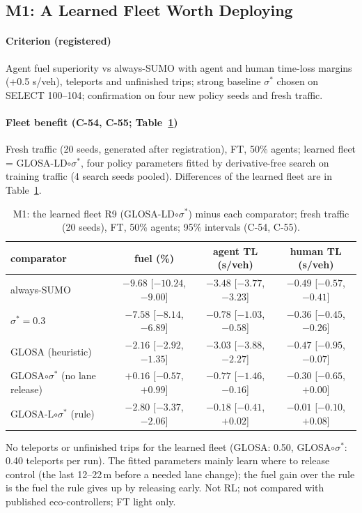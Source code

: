\subsection{M1: A Learned Fleet Worth Deploying}\label{sec:m1}
\paragraph{Criterion (registered)} Agent fuel superiority vs always-SUMO with agent and human time-loss margins (+0.5 s/veh),
teleports and unfinished trips; strong baseline $\sigma^*$ chosen on SELECT 100--104; confirmation on four new policy seeds and fresh traffic.
\paragraph{Fleet benefit (C-54, C-55; Table~\ref{tab:m1})} Fresh traffic (20 seeds, generated after registration), FT, 50\% agents; learned
fleet = GLOSA-LD$\circ\sigma^*$, four policy parameters fitted by derivative-free search on training traffic (4 search seeds pooled).
Differences of the learned fleet are in Table~\ref{tab:m1}.
\begin{table}[t]\centering\small
\caption{M1: the learned fleet R9 (GLOSA-LD$\circ\sigma^*$) minus each comparator; fresh traffic (20 seeds), FT, 50\% agents; 95\%
intervals (C-54, C-55).}\label{tab:m1}
\begin{tabular}{lccc}\toprule
comparator & fuel (\%) & agent TL (s/veh) & human TL (s/veh)\\\midrule
always-SUMO & $-9.68$ [$-10.24$, $-9.00$] & $-3.48$ [$-3.77$, $-3.23$] & $-0.49$ [$-0.57$, $-0.41$]\\
$\sigma^*=0.3$ & $-7.58$ [$-8.14$, $-6.89$] & $-0.78$ [$-1.03$, $-0.58$] & $-0.36$ [$-0.45$, $-0.26$]\\
GLOSA (heuristic) & $-2.16$ [$-2.92$, $-1.35$] & $-3.03$ [$-3.88$, $-2.27$] & $-0.47$ [$-0.95$, $-0.07$]\\
GLOSA$\circ\sigma^*$ (no lane release) & $+0.16$ [$-0.57$, $+0.99$] & $-0.77$ [$-1.46$, $-0.16$] & $-0.30$ [$-0.65$, $+0.00$]\\
GLOSA-L$\circ\sigma^*$ (rule) & $-2.80$ [$-3.37$, $-2.06$] & $-0.18$ [$-0.41$, $+0.02$] & $-0.01$ [$-0.10$, $+0.08$]\\\bottomrule
\end{tabular}\end{table}
No teleports or unfinished trips for the learned fleet (GLOSA: 0.50, GLOSA$\circ\sigma^*$: 0.40 teleports per run). The fitted
parameters mainly learn where to release control (the last 12--22\,m before a needed lane change); the fuel gain over the rule is the
fuel the rule gives up by releasing early. Not RL; not compared with published eco-controllers; FT light only.
